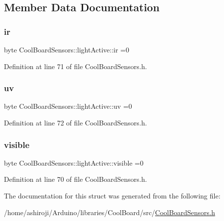 \subsection{Member Data Documentation}
\mbox{\label{struct_cool_board_sensors_1_1light_active_a67700895349b95ceb263f1a6da756315}} 
\subsubsection{\texorpdfstring{ir}{ir}}
{\footnotesize\ttfamily byte Cool\+Board\+Sensors\+::light\+Active\+::ir =0}



Definition at line 71 of file Cool\+Board\+Sensors.\+h.

\mbox{\label{struct_cool_board_sensors_1_1light_active_a949a7aaf5166d981de8fe0fd93da20d6}} 
\subsubsection{\texorpdfstring{uv}{uv}}
{\footnotesize\ttfamily byte Cool\+Board\+Sensors\+::light\+Active\+::uv =0}



Definition at line 72 of file Cool\+Board\+Sensors.\+h.

\mbox{\label{struct_cool_board_sensors_1_1light_active_abcbba296b6a95e67c0cd2555d9dd50c7}} 
\subsubsection{\texorpdfstring{visible}{visible}}
{\footnotesize\ttfamily byte Cool\+Board\+Sensors\+::light\+Active\+::visible =0}



Definition at line 70 of file Cool\+Board\+Sensors.\+h.



The documentation for this struct was generated from the following file\+:\begin{DoxyCompactItemize}
\item 
/home/ashiroji/\+Arduino/libraries/\+Cool\+Board/src/\hyperlink{_cool_board_sensors_8h}{Cool\+Board\+Sensors.\+h}\end{DoxyCompactItemize}
